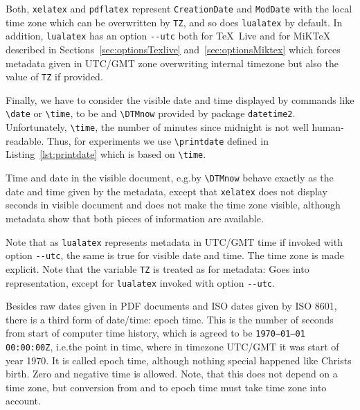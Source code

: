 \documentclass[a4paper, english]{article}%
\newcommand{\pdflatex}{\texttt{pdflatex}}
\newcommand{\lualatex}{\texttt{lualatex}}
\newcommand{\xelatex}{\texttt{xelatex}}
\newcommand{\cmd}[1]{\texttt{\textbackslash#1}}
\newcommand{\texlive}{\TeX~Live}
\newcommand{\miktex}{MiKTeX}
\begin{document}
Both, \xelatex{} and \pdflatex{} represent \texttt{CreationDate} and \texttt{ModDate} 
with the local time zone which can be overwritten by \texttt{TZ}, and so does \lualatex{} by default. 
In addition, \lualatex{} has an option \texttt{-{}-utc} 
both for \texlive{} and for \miktex{} 
described in Sections~\ref{sec:optionsTexlive} and~\ref{sec:optionsMiktex} 
which forces metadata given in UTC/GMT zone 
overwriting internal timezone but also the value of \texttt{TZ} if provided. 

Finally, we have to consider the visible date and time 
displayed by commands like \cmd{date} or \cmd{time}, to be 
and \cmd{DTMnow} provided by package \texttt{datetime2}. 
Unfortunately, \cmd{time}, the number of minutes since midnight is not well human-readable. 
Thus, for experiments we use \cmd{printdate} defined in Listing~\ref{lst:printdate} 
which is based on \cmd{time}. 





Time and date in the visible document, e.g.\@ by \cmd{DTMnow} 
behave exactly as the date and time given by the metadata, 
except that \xelatex{} does not display seconds in visible document 
and does not make the time zone visible, 
although metadata show that both pieces of information are available. 

Note that as \lualatex{} represents metadata in UTC/GMT time if invoked with option \texttt{-{}-utc}, 
the same is true for visible date and time. 
The time zone is made explicit. 
Note that the variable \texttt{TZ} is treated as for metadata: 
Goes into representation, except for \lualatex{} invoked with option \texttt{-{}-utc}. 
\medskip






Besides raw dates given in PDF documents and ISO dates given by ISO 8601, 
there is a third form of date/time: epoch time. 
This is the number of seconds from start of computer time history, 
which is agreed to be \texttt{1970--01--01 00:00:00Z}, 
i.e.\@ the point in time, where in timezone UTC/GMT it was start of year 1970. 
It is called epoch time, although nothing special happened like Christs birth. 
Zero and negative time is allowed. 
Note, that this does not depend on a time zone, 
but conversion from and to epoch time must take time zone into account. 
\end{document}
